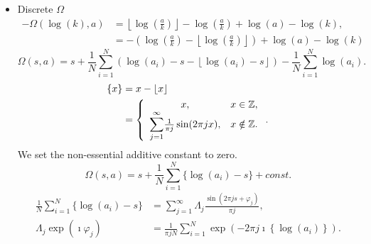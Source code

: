 \documentclass[titlepage,fleqn]{article}%
\providecommand{\U}[1]{\protect\rule{.1in}{.1in}}
\begin{document}
\begin{itemize}
\item Discrete $\Omega$%
\begin{align*}
-\Omega(\log(k),a)  &  =\left\lfloor \log\left(  \frac{a}{k}\right)
\right\rfloor -\log\left(  \frac{a}{k}\right)  +\log\left(  a\right)
-\log\left(  k\right)  ,\\
&  =-\left(  \log\left(  \frac{a}{k}\right)  -\left\lfloor \log\left(
\frac{a}{k}\right)  \right\rfloor \right)  +\log\left(  a\right)  -\log\left(
k\right)
\end{align*}%
\[
\Omega(s,a)=s+\frac{1}{N}%
{\displaystyle\sum\limits_{i=1}^{N}}
\left(  \log\left(  a_{i}\right)  -s-\left\lfloor \log\left(  a_{i}\right)
-s\right\rfloor \right)  -\frac{1}{N}%
{\displaystyle\sum\limits_{i=1}^{N}}
\log\left(  a_{i}\right)  .
\]%
\begin{align*}
\{x\}  &  =x-\left\lfloor x\right\rfloor \\
&  =\left\{
\begin{array}
[c]{cc}%
x, & x\in%
\mathbb{Z}
,\\%
{\displaystyle\sum\limits_{j=1}^{\infty}}
\frac{1}{\pi j}\sin(2\pi jx), & x\notin%
\mathbb{Z}
.
\end{array}
\right.  .
\end{align*}
We set the non-essential additive constant to zero.%
\[
\Omega(s,a)=s+\frac{1}{N}%
{\displaystyle\sum\limits_{i=1}^{N}}
\{\log\left(  a_{i}\right)  -s\}+const.
\]%
\begin{align*}
\frac{1}{N}%
{\displaystyle\sum\limits_{i=1}^{N}}
\{\log\left(  a_{i}\right)  -s\}  &  =%
{\displaystyle\sum\limits_{j=1}^{\infty}}
\Lambda_{j}\frac{\sin(2\pi js+\varphi_{j})}{\pi j},\\
\Lambda_{j}\exp(\imath\varphi_{j})  &  =\frac{1}{\pi jN}%
{\displaystyle\sum\limits_{i=1}^{N}}
\exp(-2\pi j\imath\left\{  \log\left(  a_{i}\right)  \right\}  ).
\end{align*}



\end{itemize}
\end{document}
